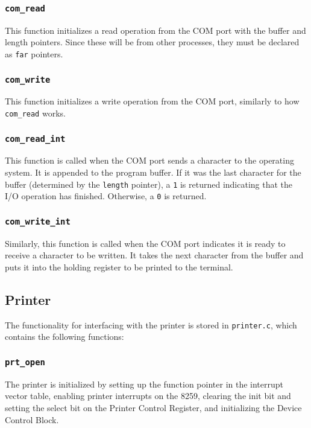 \subsubsection{\tt com\_read}

This function initializes a read operation from the COM port with the buffer and length pointers. Since these will be from other processes, they must be declared as {\tt far} pointers.

\subsubsection{\tt com\_write}

This function initializes a write operation from the COM port, similarly to how {\tt com\_read} works.

\subsubsection{\tt com\_read\_int}

This function is called when the COM port sends a character to the operating system. It is appended to the program buffer. If it was the last character for the buffer (determined by the {\tt length} pointer), a {\tt 1} is returned indicating that the I/O operation has finished. Otherwise, a {\tt 0} is returned.

\subsubsection{\tt com\_write\_int}

Similarly, this function is called when the COM port indicates it is ready to receive a character to be written. It takes the next character from the buffer and puts it into the holding register to be printed to the terminal.

\subsection{Printer}

The functionality for interfacing with the printer is stored in {\tt printer.c}, which contains the following functions:

\subsubsection{\tt prt\_open}

The printer is initialized by setting up the function pointer in the interrupt vector table, enabling printer interrupts on the 8259, clearing the init bit and setting the select bit on the Printer Control Register, and initializing the Device Control Block.

